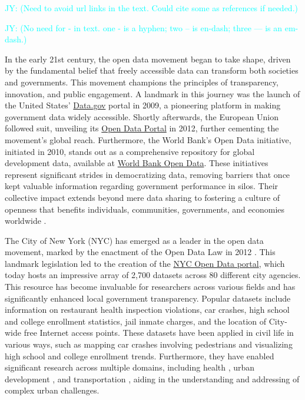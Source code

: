 \documentclass[linenumber]{jdsart}
\newcommand{\jy}[1]{\textcolor{cyan}{JY: (#1)}}
\begin{document}
\jy{Need to avoid url links in the text. Could cite some as references
  if needed.}

\jy{No need for \mbox{-} in text.  one - is a hyphen; two -- is
  en-dash;   three --- is an em-dash.}

In the early 21st century, the open data movement began 
to take shape, driven by the fundamental belief that 
freely accessible data can transform both societies and 
governments. This movement champions the principles
of transparency, innovation, and public engagement. 
A landmark in this journey was the launch of the United States'
\href{https://www.data.gov}{Data.gov} portal in 2009, a pioneering
platform in making government data widely accessible. Shortly afterwards,
the European Union followed suit, unveiling its
\href{https://data.europa.eu/euodp}{Open Data Portal} in 2012, further
cementing the movement's global reach. Furthermore, the World Bank's Open
Data initiative, initiated in 2010, stands out as a comprehensive
repository for global development data, available at
\href{https://data.worldbank.org}{World Bank Open Data}. 
These initiatives represent significant strides in democratizing data, 
removing barriers that once kept valuable information 
regarding government performance in silos. Their collective impact 
extends beyond mere data sharing to fostering a culture of openness 
that benefits individuals, communities, governments, and economies worldwide 
\citep{barns2016mine, wang2016adoption}.


The City of New York (NYC) has emerged as a leader in the open data movement,
marked by the enactment of the Open Data Law in 2012
\citep{zuiderwijk2014open}. This landmark legislation led to the
creation of the \href{https://opendata.cityofnewyork.us}{NYC Open Data
  portal}, which today hosts an impressive array of 2,700 datasets
across 80 different city agencies. This resource has become invaluable
for researchers across various fields and has significantly enhanced
local government transparency. Popular datasets include information on
restaurant health inspection violations, car crashes, high school and
college enrollment statistics, jail inmate charges, and the location
of City\mbox{-}wide free Internet access points. These datasets have been
applied in civil life in various ways, such as mapping car crashes
involving pedestrians and visualizing high school and college
enrollment trends. Furthermore, they have enabled significant research
across multiple domains, including health \citep{cantor2018facets, 
shankar2021data}, urban development \citep{neves2020impacts}, and
transportation \citep{gerte2019understanding}, aiding in the
understanding and addressing of complex urban challenges.
\end{document}

